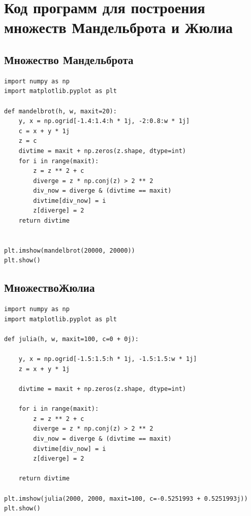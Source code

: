 \section{Код программ для построения множеств Мандельброта и Жюлиа}

\subsection{Множество Мандельброта}

\begin{lstlisting}
import numpy as np
import matplotlib.pyplot as plt

def mandelbrot(h, w, maxit=20):
    y, x = np.ogrid[-1.4:1.4:h * 1j, -2:0.8:w * 1j]
    c = x + y * 1j
    z = c
    divtime = maxit + np.zeros(z.shape, dtype=int)
    for i in range(maxit):
        z = z ** 2 + c
        diverge = z * np.conj(z) > 2 ** 2
        div_now = diverge & (divtime == maxit)
        divtime[div_now] = i
        z[diverge] = 2
    return divtime


plt.imshow(mandelbrot(20000, 20000))
plt.show()

\end{lstlisting}

\subsection{МножествоЖюлиа}

\begin{lstlisting}
import numpy as np
import matplotlib.pyplot as plt

def julia(h, w, maxit=100, c=0 + 0j):

    y, x = np.ogrid[-1.5:1.5:h * 1j, -1.5:1.5:w * 1j]
    z = x + y * 1j

    divtime = maxit + np.zeros(z.shape, dtype=int)

    for i in range(maxit):
        z = z ** 2 + c
        diverge = z * np.conj(z) > 2 ** 2
        div_now = diverge & (divtime == maxit)
        divtime[div_now] = i
        z[diverge] = 2

    return divtime

plt.imshow(julia(2000, 2000, maxit=100, c=-0.5251993 + 0.5251993j))
plt.show()
\end{lstlisting}


